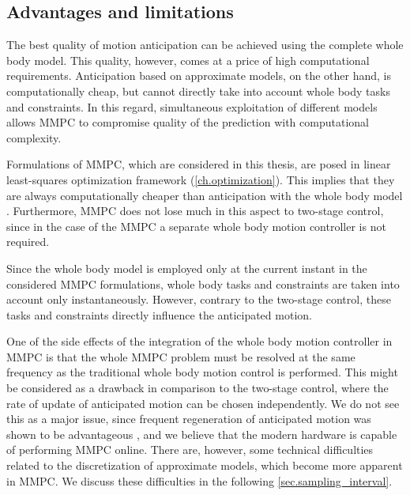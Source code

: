\subsection{Advantages and limitations}\label{sec.mmpc_advantages_limitations}

The best quality of motion anticipation can be achieved using the complete
whole body model. This quality, however, comes at a price of high computational
requirements. Anticipation based on approximate models, on the other hand, is
computationally cheap, but cannot directly take into account whole body tasks
and constraints. In this regard, simultaneous exploitation of different models
allows \ac{MMPC} to compromise quality of the prediction with computational
complexity.


Formulations of \ac{MMPC}, which are considered in this thesis, are posed in
linear least-squares optimization framework (\cref{ch.optimization}). This
implies that they are always computationally cheaper than anticipation with the
whole body model \cite{Koenemann2015iros}. Furthermore, \ac{MMPC} does not lose
much in this aspect to two-stage control, since in the case of the \ac{MMPC} a
separate whole body motion controller is not required.


Since the whole body model is employed only at the current instant in the
considered \ac{MMPC} formulations, whole body tasks and constraints are taken
into account only instantaneously. However, contrary to the two-stage control,
these tasks and constraints directly influence the anticipated motion.


One of the side effects of the integration of the whole body motion controller
in \ac{MMPC} is that the whole \ac{MMPC} problem must be resolved at the same
frequency as the traditional whole body motion control is performed. This might
be considered as a drawback in comparison to the two-stage control, where the
rate of update of anticipated motion can be chosen independently. We do not see
this as a major issue, since frequent regeneration of anticipated motion was
shown to be advantageous \cite{Nishiwaki2009ijrr}, and we believe that the
modern hardware is capable of performing \ac{MMPC} online. There are, however,
some technical difficulties related to the discretization of approximate
models, which become more apparent in \ac{MMPC}. We discuss these difficulties
in the following \cref{sec.sampling_interval}.



